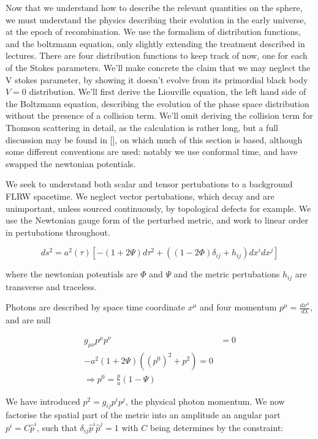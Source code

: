 \documentclass[a4paper,11pt]{article}
\begin{document}
Now that we understand how to describe the relevant quantities on the sphere, we must understand the physics describing their evolution in the early universe, at the epoch of recombination. We use the formalism of distribution functions, and the boltzmann equation, only slightly extending the treatment described in lectures. There are four distribution functions to keep track of now, one for each of the Stokes parameters. We'll make concrete the claim that we may neglect the V stokes parameter, by showing it doesn't evolve from its primordial black body $V=0$ distribution. We'll first derive the Liouville equation, the left hand side of the Boltzmann equation, describing the evolution of the phase space distribution without the presence of a collision term. We'll omit deriving the collision term for Thomson scattering in detail, as the calculation is rather long, but a full discussion may be found in [], on which much of this section is based, although some different conventions are used: notably we use conformal time, and have swapped the newtonian potentials.

We seek to understand both scalar and tensor pertubations to a background FLRW spacetime. We neglect vector pertubations, which decay and are unimportant, unless sourced continuously, by topological defects for example. We use the Newtonian gauge form of the perturbed metric, and work to linear order in pertubations throughout.

\begin{equation}
ds^2 = a^2(\tau) [-(1+2\Psi)d\tau^2 + ((1-2\Phi)\delta_{ij} +h_{ij})dx^idx^j]
\end{equation}

where the newtonian potentials are $\Phi$ and $\Psi$ and the metric pertubations $h_{ij}$ are transverse and traceless. 


Photons are described by space time coordinate $x^\mu$ and four momentum $p^\mu=\frac{dx^\mu}{d\lambda}$, and are null

\begin{align}
g_{\mu\nu}p^\mu p^\nu&=0\\
-a^2(1+2\Psi)((p^0)^2 + p^2) = 0\\
\Rightarrow p^0 = \frac{p}{a}(1-\Psi)
\end{align}

We have introduced $p^2=g_{ij}p^ip^j$, the physical photon momentum. We now factorise the spatial part of the metric into an amplitude an angular part $p^i = C\hat{p}^i$, such that $\delta_{ij}\hat{p}^i\hat{p}^j=1$ with $C$ being determines by the constraint:
\end{document}
